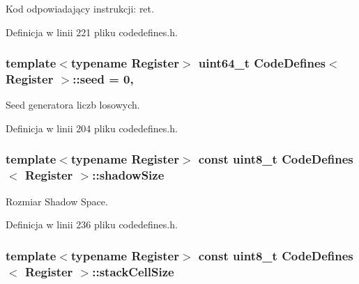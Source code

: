 Kod odpowiadający instrukcji\-: ret. 



Definicja w linii 221 pliku codedefines.\-h.

\hypertarget{class_code_defines_a962393fc932700039b48a9a35b0bd4d2}{
\subsubsection[{seed}]{\setlength{\rightskip}{0pt plus 5cm}template$<$typename Register$>$ uint64\-\_\-t {\bf Code\-Defines}$<$ Register $>$\-::seed = 0\hspace{0.3cm}{\ttfamily [static]}, {\ttfamily [private]}}}\label{class_code_defines_a962393fc932700039b48a9a35b0bd4d2}


Seed generatora liczb losowych. 



Definicja w linii 204 pliku codedefines.\-h.

\hypertarget{class_code_defines_a89139a3f358c98200f78478fd0dd3bd9}{
\subsubsection[{shadow\-Size}]{\setlength{\rightskip}{0pt plus 5cm}template$<$typename Register$>$ const uint8\-\_\-t {\bf Code\-Defines}$<$ Register $>$\-::shadow\-Size\hspace{0.3cm}{\ttfamily [static]}}}\label{class_code_defines_a89139a3f358c98200f78478fd0dd3bd9}


Rozmiar Shadow Space. 



Definicja w linii 236 pliku codedefines.\-h.

\hypertarget{class_code_defines_add79526fe978503123140edf11497d66}{
\subsubsection[{stack\-Cell\-Size}]{\setlength{\rightskip}{0pt plus 5cm}template$<$typename Register$>$ const uint8\-\_\-t {\bf Code\-Defines}$<$ Register $>$\-::stack\-Cell\-Size\hspace{0.3cm}{\ttfamily [static]}}}\label{class_code_defines_add79526fe978503123140edf11497d66}


